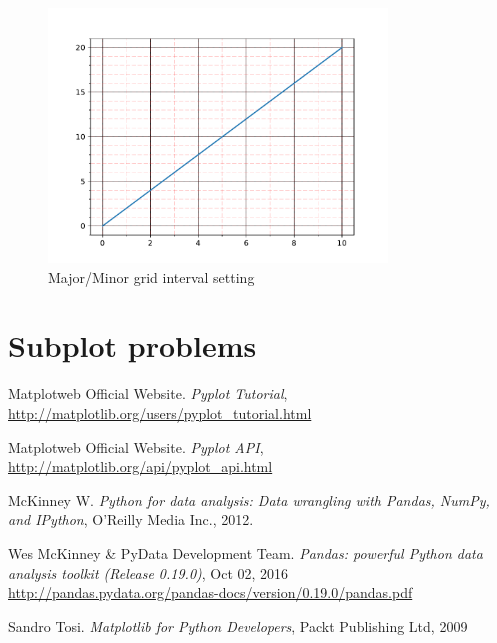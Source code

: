 \documentclass{report}
\begin{document}
\begin{figure}[!htb]
  \centering
  \includegraphics[width=90mm]{sol-tick-minorinterval}
  \caption{Major/Minor grid interval setting}
  \label{fig:sol-tick-minorinterval}
\end{figure}

\section{Subplot problems}
\label{sec:advancedsubplot}

%
%

\appendix
\renewcommand{\chaptername}{Appendix}

\begin{thebibliography}{9}
 Matplotweb Official Website. 
  \newblock \emph{Pyplot Tutorial}, \\ \url{http://matplotlib.org/users/pyplot_tutorial.html}

 Matplotweb Official Website. 
  \newblock \emph{Pyplot API}, \\  
  \url{http://matplotlib.org/api/pyplot_api.html}

 McKinney W. 
  \newblock \emph{Python for data analysis: Data wrangling with Pandas, NumPy, and IPython}, 
  \newblock O'Reilly Media Inc., 2012.

 Wes McKinney \& PyData Development Team. 
  \newblock \emph{Pandas: powerful Python data analysis toolkit (Release 0.19.0)}, 
  \newblock Oct 02, 2016 \\
  \url{http://pandas.pydata.org/pandas-docs/version/0.19.0/pandas.pdf}

 Sandro Tosi.
  \newblock \emph{Matplotlib for Python Developers},
  \newblock Packt Publishing Ltd, 2009
\end{thebibliography}
\end{document}

